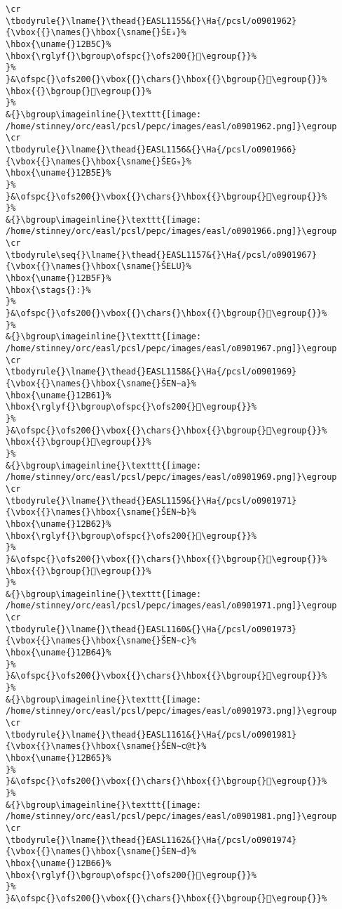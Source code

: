 \begin{verbatim}
\cr
\tbodyrule{}\lname{}\thead{}EASL1155&{}\Ha{/pcsl/o0901962}{\vbox{{}\names{}\hbox{\sname{}ŠE₃}%
\hbox{\uname{}12B5C}%
\hbox{\rglyf{}\bgroup\ofspc{}\ofs200{}𒭜\egroup{}}%
}%
}&\ofspc{}\ofs200{}\vbox{{}\chars{}\hbox{{}\bgroup{}𒭚\egroup{}}%
\hbox{{}\bgroup{}𒭜\egroup{}}%
}%
&{}\bgroup\imageinline{}\texttt{[image: /home/stinney/orc/easl/pcsl/pepc/images/easl/o0901962.png]}\egroup
\cr
\tbodyrule{}\lname{}\thead{}EASL1156&{}\Ha{/pcsl/o0901966}{\vbox{{}\names{}\hbox{\sname{}ŠEG₉}%
\hbox{\uname{}12B5E}%
}%
}&\ofspc{}\ofs200{}\vbox{{}\chars{}\hbox{{}\bgroup{}𒭞\egroup{}}%
}%
&{}\bgroup\imageinline{}\texttt{[image: /home/stinney/orc/easl/pcsl/pepc/images/easl/o0901966.png]}\egroup
\cr
\tbodyrule\seq{}\lname{}\thead{}EASL1157&{}\Ha{/pcsl/o0901967}{\vbox{{}\names{}\hbox{\sname{}ŠELU}%
\hbox{\uname{}12B5F}%
\hbox{\stags{}:}%
}%
}&\ofspc{}\ofs200{}\vbox{{}\chars{}\hbox{{}\bgroup{}𒭟\egroup{}}%
}%
&{}\bgroup\imageinline{}\texttt{[image: /home/stinney/orc/easl/pcsl/pepc/images/easl/o0901967.png]}\egroup
\cr
\tbodyrule{}\lname{}\thead{}EASL1158&{}\Ha{/pcsl/o0901969}{\vbox{{}\names{}\hbox{\sname{}ŠEN∼a}%
\hbox{\uname{}12B61}%
\hbox{\rglyf{}\bgroup\ofspc{}\ofs200{}𒭡\egroup{}}%
}%
}&\ofspc{}\ofs200{}\vbox{{}\chars{}\hbox{{}\bgroup{}𒭠\egroup{}}%
\hbox{{}\bgroup{}𒭡\egroup{}}%
}%
&{}\bgroup\imageinline{}\texttt{[image: /home/stinney/orc/easl/pcsl/pepc/images/easl/o0901969.png]}\egroup
\cr
\tbodyrule{}\lname{}\thead{}EASL1159&{}\Ha{/pcsl/o0901971}{\vbox{{}\names{}\hbox{\sname{}ŠEN∼b}%
\hbox{\uname{}12B62}%
\hbox{\rglyf{}\bgroup\ofspc{}\ofs200{}𒭢\egroup{}}%
}%
}&\ofspc{}\ofs200{}\vbox{{}\chars{}\hbox{{}\bgroup{}𒭢\egroup{}}%
\hbox{{}\bgroup{}𒭣\egroup{}}%
}%
&{}\bgroup\imageinline{}\texttt{[image: /home/stinney/orc/easl/pcsl/pepc/images/easl/o0901971.png]}\egroup
\cr
\tbodyrule{}\lname{}\thead{}EASL1160&{}\Ha{/pcsl/o0901973}{\vbox{{}\names{}\hbox{\sname{}ŠEN∼c}%
\hbox{\uname{}12B64}%
}%
}&\ofspc{}\ofs200{}\vbox{{}\chars{}\hbox{{}\bgroup{}𒭤\egroup{}}%
}%
&{}\bgroup\imageinline{}\texttt{[image: /home/stinney/orc/easl/pcsl/pepc/images/easl/o0901973.png]}\egroup
\cr
\tbodyrule{}\lname{}\thead{}EASL1161&{}\Ha{/pcsl/o0901981}{\vbox{{}\names{}\hbox{\sname{}ŠEN∼c@t}%
\hbox{\uname{}12B65}%
}%
}&\ofspc{}\ofs200{}\vbox{{}\chars{}\hbox{{}\bgroup{}𒭥\egroup{}}%
}%
&{}\bgroup\imageinline{}\texttt{[image: /home/stinney/orc/easl/pcsl/pepc/images/easl/o0901981.png]}\egroup
\cr
\tbodyrule{}\lname{}\thead{}EASL1162&{}\Ha{/pcsl/o0901974}{\vbox{{}\names{}\hbox{\sname{}ŠEN∼d}%
\hbox{\uname{}12B66}%
\hbox{\rglyf{}\bgroup\ofspc{}\ofs200{}𒭦\egroup{}}%
}%
}&\ofspc{}\ofs200{}\vbox{{}\chars{}\hbox{{}\bgroup{}𒭦\egroup{}}%

\end{verbatim}
